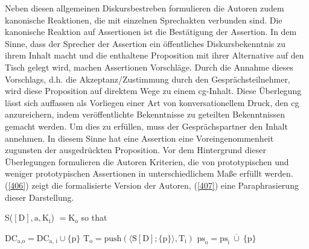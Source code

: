 Neben diesen allgemeinen Diskursbestreben formulieren die Autoren zudem kanoni\-sche Reaktionen, die mit einzelnen Sprechakten verbunden sind. Die kanonische Reaktion auf Assertionen ist die Bestätigung der Assertion. In dem Sinne, dass der Sprecher der Assertion ein öffentliches Diskursbekenntnis zu ihrem Inhalt macht und die enthaltene Proposition mit ihrer Alternative auf den Tisch gelegt wird, machen Assertionen Vorschläge. Durch die Annahme dieses Vor\-schlags, d.h. die Akzeptanz/Zustimmung durch den Gesprächsteilnehmer, wird diese Proposition auf direktem Wege zu einem cg-Inhalt. Diese Überlegung lässt sich auffassen als Vorliegen einer Art von konversationellem Druck, den cg anzurei\-chern, indem veröffentlichte Bekenntnisse zu geteilten Bekenntnissen gemacht werden. Um dies zu erfüllen, muss der Gesprächspartner den Inhalt annehmen. In diesem Sinne hat eine Assertion eine Voreingenommenheit zugunsten der ausgedrückten Proposition. Vor dem Hintergrund dieser Überlegungen formulieren die Autoren Kriterien, die von prototypischen und weniger prototypischen Assertionen  in unterschiedlichem Maße erfüllt werden. (\ref{406}) zeigt die formalisierte Version der Autoren, (\ref{407}) eine Paraphrasierung dieser Darstellung.

\begin{exe}
	\ex\label{406} 
		S($[\textrm{D}], \textrm{a}, \textrm{K}_{\textrm{i}}$) $= \textrm{K}_{\textrm{o}}$ so that
		\begin{xlist}	
			\ex\label{406a} $\textrm{DC}_{\textrm{a,o}} = \textrm{DC}_{\textrm{a, i}} \cup \lbrace\textrm{p}\rbrace$
			\ex\label{406b} $\textrm{T}_{\textrm{o}} = \textrm{push}(\langle \textrm{S}[\textrm{D}]; \lbrace \textrm{p} \rbrace \rangle, \textrm{T}_{\textrm{i}})$
			\ex\label{406c} $\textrm{ps}_{\textrm{o}} =  \textrm{ps}_{\textrm{i}} \ \overline\cup \ \lbrace \textrm{p} \rbrace$
			\hfill\hbox{\citet[92]{Farkas2010}}
		\end{xlist}
\end{exe}

